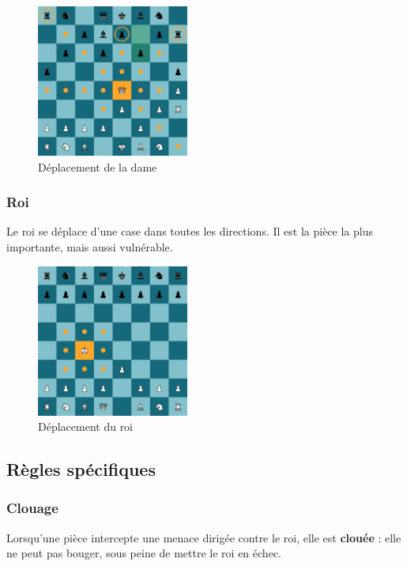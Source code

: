 \documentclass{article}
\begin{document}
\begin{figure}[h]
    \centering
    \includegraphics[width=\textwidth,height=5.0cm,keepaspectratio]{dameMove.png}
    \caption{Déplacement de la dame}
\end{figure}

\subsubsection*{Roi}
Le roi se déplace d'une case dans toutes les directions. Il est la pièce la plus importante, mais aussi vulnérable.

\begin{figure}[h]
    \centering
    \includegraphics[width=\textwidth,height=5.0cm,keepaspectratio]{roiMove.png}
    \caption{Déplacement du roi}
\end{figure}

\subsection{Règles spécifiques}

\subsubsection*{Clouage}
Lorsqu'une pièce intercepte une menace dirigée contre le roi, elle est \textbf{clouée} : elle ne peut pas bouger, sous peine de mettre le roi en échec.
\end{document}
